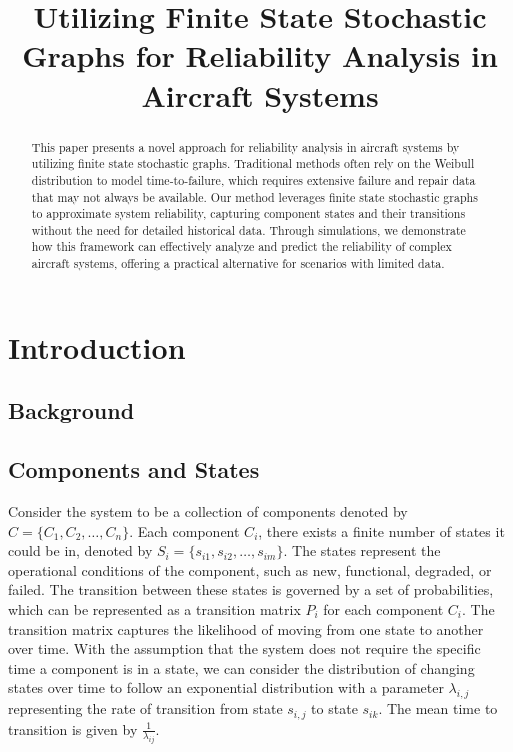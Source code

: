 \documentclass[answers,12pt,addpoints]{exam}
\author{\name}
\title{Utilizing Finite State Stochastic Graphs for Reliability Analysis in Aircraft Systems}
\begin{document}
\maketitle

\begin{abstract}
    This paper presents a novel approach for reliability analysis in aircraft systems by utilizing finite state stochastic graphs. Traditional methods often rely on the Weibull distribution to model time-to-failure, which requires extensive failure and repair data that may not always be available. Our method leverages finite state stochastic graphs to approximate system reliability, capturing component states and their transitions without the need for detailed historical data. Through simulations, we demonstrate how this framework can effectively analyze and predict the reliability of complex aircraft systems, offering a practical alternative for scenarios with limited data.
\end{abstract}

\section{Introduction}
\subsection{Background}

\subsection{Components and States}
Consider the system to be a collection of components denoted by $C = \{C_1, C_2, \ldots, C_n\}$. Each component $C_i$, there exists a finite number of states it could be in, denoted by $S_i = \{s_{i1}, s_{i2}, \ldots, s_{im}\}$. The states represent the operational conditions of the component, such as new, functional, degraded, or failed. The transition between these states is governed by a set of probabilities, which can be represented as a transition matrix $P_i$ for each component $C_i$. The transition matrix captures the likelihood of moving from one state to another over time. With the assumption that the system does not require the specific time a component is in a state, we can consider the distribution of changing states over time to follow an exponential distribution with a parameter $\lambda_{i,j}$ representing the rate of transition from state $s_{i,j}$ to state $s_{ik}$. The mean time to transition is given by $\frac{1}{\lambda_{ij}}$.\\
\end{document}
